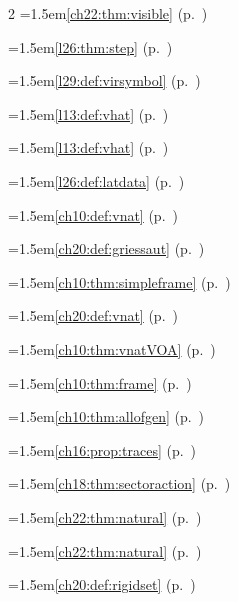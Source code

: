 \begin{multicols}{2}
\hangindent=1.5em\quad \ref{ch22:thm:visible} (p.~\pageref{ch22:thm:visible})\par
\hangindent=1.5em\quad \ref{l26:thm:step} (p.~\pageref{l26:thm:step})\par
\hangindent=1.5em\quad \ref{l29:def:virsymbol} (p.~\pageref{l29:def:virsymbol})\par
\hangindent=1.5em\quad \ref{l13:def:vhat} (p.~\pageref{l13:def:vhat})\par
\hangindent=1.5em\quad \ref{l13:def:vhat} (p.~\pageref{l13:def:vhat})\par
\hangindent=1.5em\quad \ref{l26:def:latdata} (p.~\pageref{l26:def:latdata})\par
\hangindent=1.5em\quad \ref{ch10:def:vnat} (p.~\pageref{ch10:def:vnat})\par
\hangindent=1.5em\quad \ref{ch20:def:griessaut} (p.~\pageref{ch20:def:griessaut})\par
\hangindent=1.5em\quad \ref{ch10:thm:simpleframe} (p.~\pageref{ch10:thm:simpleframe})\par
\hangindent=1.5em\quad \ref{ch20:def:vnat} (p.~\pageref{ch20:def:vnat})\par
\hangindent=1.5em\quad \ref{ch10:thm:vnatVOA} (p.~\pageref{ch10:thm:vnatVOA})\par
\hangindent=1.5em\quad \ref{ch10:thm:frame} (p.~\pageref{ch10:thm:frame})\par
\hangindent=1.5em\quad \ref{ch10:thm:allofgen} (p.~\pageref{ch10:thm:allofgen})\par
\hangindent=1.5em\quad \ref{ch16:prop:traces} (p.~\pageref{ch16:prop:traces})\par
\hangindent=1.5em\quad \ref{ch18:thm:sectoraction} (p.~\pageref{ch18:thm:sectoraction})\par
\hangindent=1.5em\quad \ref{ch22:thm:natural} (p.~\pageref{ch22:thm:natural})\par
\hangindent=1.5em\quad \ref{ch22:thm:natural} (p.~\pageref{ch22:thm:natural})\par
\hangindent=1.5em\quad \ref{ch20:def:rigidset} (p.~\pageref{ch20:def:rigidset})\par

\end{multicols}
